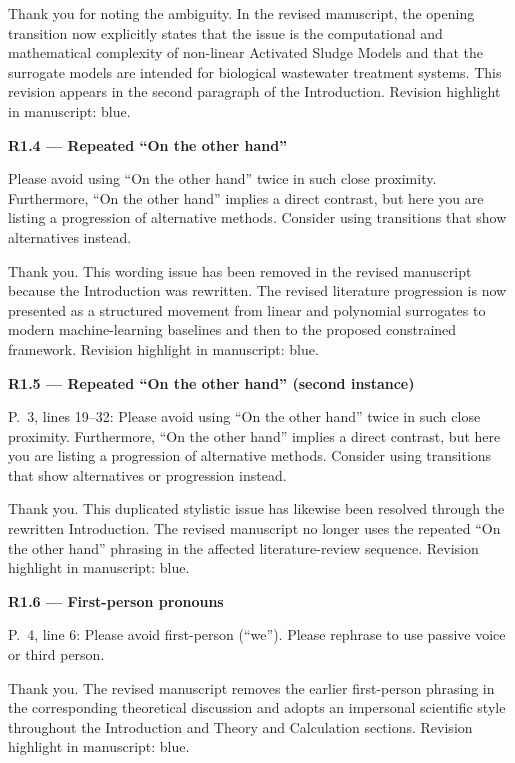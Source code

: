 \documentclass[a4paper,11pt]{article}
\newcommand{\reviewlabel}[1]{\noindent\textbf{\textcolor{accentblue}{#1}}\par\medskip}
\newcommand{\revhighlight}[2]{\textcolor{#1}{Revision highlight in manuscript: #2.}}
\begin{document}
Thank you for noting the ambiguity. In the revised manuscript, the opening transition now explicitly states that the issue is the computational and mathematical complexity of non-linear Activated Sludge Models and that the surrogate models are intended for biological wastewater treatment systems. This revision appears in the second paragraph of the Introduction. \revhighlight{revDefault}{blue}

\reviewlabel{R1.4 --- Repeated ``On the other hand''}
\begin{reviewbox}
Please avoid using ``On the other hand'' twice in such close proximity. Furthermore, ``On the other hand'' implies a direct contrast, but here you are listing a progression of alternative methods. Consider using transitions that show alternatives instead.
\end{reviewbox}

Thank you. This wording issue has been removed in the revised manuscript because the Introduction was rewritten. The revised literature progression is now presented as a structured movement from linear and polynomial surrogates to modern machine-learning baselines and then to the proposed constrained framework. \revhighlight{revDefault}{blue}

\reviewlabel{R1.5 --- Repeated ``On the other hand'' (second instance)}
\begin{reviewbox}
P.~3, lines 19--32: Please avoid using ``On the other hand'' twice in such close proximity. Furthermore, ``On the other hand'' implies a direct contrast, but here you are listing a progression of alternative methods. Consider using transitions that show alternatives or progression instead.
\end{reviewbox}

Thank you. This duplicated stylistic issue has likewise been resolved through the rewritten Introduction. The revised manuscript no longer uses the repeated ``On the other hand'' phrasing in the affected literature-review sequence. \revhighlight{revDefault}{blue}

\reviewlabel{R1.6 --- First-person pronouns}
\begin{reviewbox}
P.~4, line 6: Please avoid first-person (``we''). Please rephrase to use passive voice or third person.
\end{reviewbox}

Thank you. The revised manuscript removes the earlier first-person phrasing in the corresponding theoretical discussion and adopts an impersonal scientific style throughout the Introduction and Theory and Calculation sections. \revhighlight{revDefault}{blue}
\end{document}

